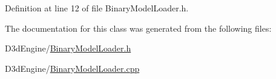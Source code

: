 Definition at line 12 of file Binary\+Model\+Loader.\+h.



The documentation for this class was generated from the following files\+:\begin{DoxyCompactItemize}
\item 
D3d\+Engine/\mbox{\hyperlink{_binary_model_loader_8h}{Binary\+Model\+Loader.\+h}}\item 
D3d\+Engine/\mbox{\hyperlink{_binary_model_loader_8cpp}{Binary\+Model\+Loader.\+cpp}}\end{DoxyCompactItemize}
